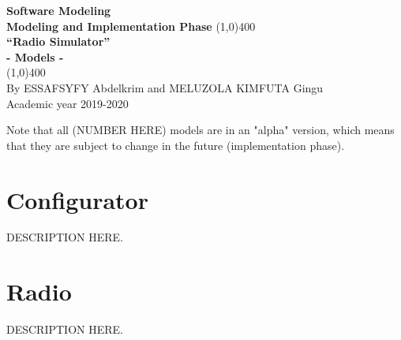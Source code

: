 \documentclass[11pt]{article}
\begin{document}
\begin{titlepage}
\begin{center}
\vspace*{1cm}
\Large{\textbf{Software Modeling}}\\
\Large{\textbf{Modeling and Implementation Phase}}
\vfill
\line(1,0){400}\\[1mm]
\huge{\textbf{“Radio Simulator”}}\\[3mm]
\Large{\textbf{- Models -}}\\[1mm]
\line(1,0){400}\\
\vfill
By ESSAFSYFY Abdelkrim and MELUZOLA KIMFUTA Gingu\\
Academic year 2019-2020

\end{center}
\end{titlepage}

\tableofcontents
\thispagestyle{empty} %
\clearpage %

\setcounter{page}{1} %

Note that all (NUMBER HERE) models are in an "alpha" version, which means that they are subject to change in the future (implementation phase).

\section{Configurator}
\vspace{20px}
\begin{center}
\end{center}
DESCRIPTION HERE.


\section{Radio}
\vspace{10px}
\begin{center}
\end{center}
DESCRIPTION HERE.
\end{document}
